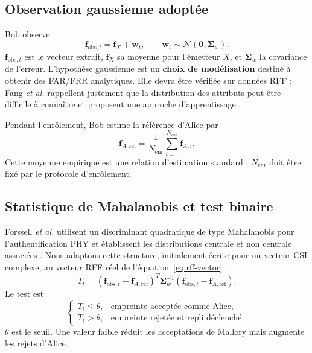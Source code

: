 \documentclass[conference,a4paper]{IEEEtran}
\begin{document}
\subsection{Observation gaussienne adoptée}
Bob observe
\begin{equation}
    \mathbf f_{\mathrm{obs},t}=\mathbf f_X+\mathbf w_t,
    \qquad
    \mathbf w_t\sim\mathcal N(\mathbf 0,\boldsymbol\Sigma_w).
    \label{eq:rff-observation}
\end{equation}
$\mathbf f_{\mathrm{obs},t}$ est le vecteur extrait, $\mathbf f_X$ sa moyenne pour l'émetteur $X$, et $\boldsymbol\Sigma_w$ la covariance de l'erreur. L'hypothèse gaussienne est un \textbf{choix de modélisation} destiné à obtenir des FAR/FRR analytiques. Elle devra être vérifiée sur données RFF ; Fang \emph{et al.} rappellent justement que la distribution des attributs peut être difficile à connaître et proposent une approche d'apprentissage \cite{fang2018}.

Pendant l'enrôlement, Bob estime la référence d'Alice par
\begin{equation}
    \mathbf f_{A,\mathrm{ref}}=\frac{1}{N_{\mathrm{enr}}}
    \sum_{i=1}^{N_{\mathrm{enr}}}\mathbf f_{A,i}.
    \label{eq:rff-reference}
\end{equation}
Cette moyenne empirique est une relation d'estimation standard ; $N_{\mathrm{enr}}$ doit être fixé par le protocole d'enrôlement.

\subsection{Statistique de Mahalanobis et test binaire}
Forssell \emph{et al.} utilisent un discriminant quadratique de type Mahalanobis pour l'authentification PHY et établissent les distributions centrale et non centrale associées \cite[Sec.~III, Eqs.~(2)--(6)]{forssell2018}. Nous adaptons cette structure, initialement écrite pour un vecteur CSI complexe, au vecteur RFF réel de l'équation~\eqref{eq:rff-vector} :
\begin{equation}
T_t=(\mathbf f_{\mathrm{obs},t}-\mathbf f_{A,\mathrm{ref}})^T
\boldsymbol\Sigma_w^{-1}
(\mathbf f_{\mathrm{obs},t}-\mathbf f_{A,\mathrm{ref}}).
\label{eq:rff-mahalanobis}
\end{equation}
Le test est
\begin{equation}
\begin{cases}
T_t\leq\theta,&\text{empreinte acceptée comme Alice},\\
T_t>\theta,&\text{empreinte rejetée et repli déclenché}.
\end{cases}
\label{eq:rff-decision}
\end{equation}
$\theta$ est le seuil. Une valeur faible réduit les acceptations de Mallory mais augmente les rejets d'Alice.
\end{document}
